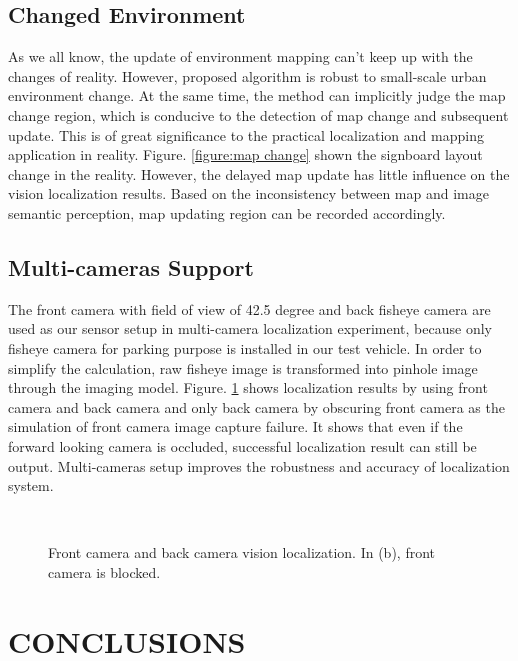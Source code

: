 \documentclass[letterpaper, 10 pt, conference]{ieeeconf}
\begin{document}
\subsection{Changed Environment}

As we all know, the update of environment mapping can't keep up with the changes of reality. However, proposed algorithm is robust to small-scale urban environment change. At the same time, the method can implicitly judge the map change region, which is conducive to the detection of map change and subsequent update. This is of great significance to the practical localization and mapping application in reality. Figure. \ref{figure:map change} shown the signboard layout change in the reality. However, the delayed map update has little influence on the vision localization results. Based on the inconsistency  between map and image semantic perception, map updating region can be recorded accordingly.


\subsection{Multi-cameras Support}

The front camera with field of view of 42.5 degree and back fisheye camera are used as our sensor setup in multi-camera localization experiment, because only fisheye camera for parking purpose is installed in our test vehicle. In order to simplify the calculation, raw fisheye image is transformed into pinhole image through the imaging model. Figure. \ref{figure:front back localization} shows localization results by using front camera and back camera and only back camera by obscuring front camera as the simulation of front camera image capture failure. It shows that even if the forward looking camera is occluded, successful localization result can still be output. Multi-cameras setup improves the robustness and accuracy of localization system.

\begin{figure}[htb]
  \\
  \caption{Front camera and back camera vision localization. In (b), front camera is blocked.} \label{figure:front back localization}
\end{figure}

\section{CONCLUSIONS}
\end{document}
